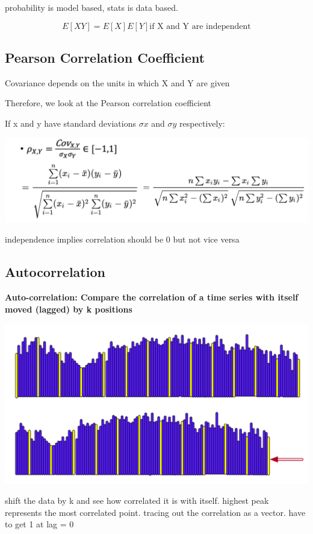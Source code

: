 \documentclass[11pt]{article}
\theoremstyle{definition}
\begin{document}
probability is model based, stats is data based.

\begin{equation}
  E[XY] = E[X]E[Y] \text{if X and Y are independent}
\end{equation}

\subsection{Pearson Correlation Coefficient}
Covariance depends on the units in which X and Y are given

Therefore, we look at the Pearson correlation coefficient

If x and y have standard deviations $\sigma x$ and $\sigma y$ respectively:

\includegraphics[width=\textwidth/2]{6.png}

independence implies correlation should be 0 but not vice versa

\subsection{Autocorrelation}
\textbf{Auto-correlation: Compare the correlation of a time series with itself
moved (lagged) by k positions}

\includegraphics[width=\textwidth/2]{7.png}

shift the data by k and see how correlated it is with itself. highest peak represents
the most correlated point. tracing out the correlation as a vector. have to get 1 at lag = 0
\end{document}
